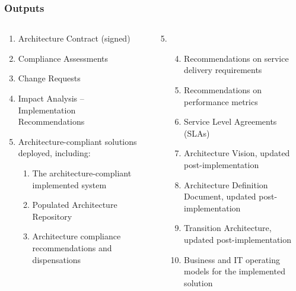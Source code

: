 \documentclass[aspectratio=169, table]{beamer}
\begin{document}
	
	\begin{frame}
		\frametitle{Outputs}
		\vspace{22pt}
		\begin{columns}[onlytextwidth]
			\begin{column}{0.5\textwidth}
				\begin{enumerate}
					\item Architecture Contract (signed)
					\item Compliance Assessments
					\item Change Requests
					\item Impact Analysis – Implementation Recommendations
					\item Architecture-compliant solutions deployed, including:
					\begin{enumerate}
						\item The architecture-compliant implemented system
						\item Populated Architecture Repository
						\item Architecture compliance recommendations and dispensations
					\end{enumerate}
				\end{enumerate}
				
			\end{column}
			\begin{column}{0.5\textwidth}
				\begin{enumerate}
					\setcounter{enumi}{4}
					\item[]
					\begin{enumerate}
						\setcounter{enumii}{3}
						\item Recommendations on service delivery requirements
						\item Recommendations on performance metrics
						\item Service Level Agreements (SLAs)
						\item Architecture Vision, updated post-implementation
						\item Architecture Definition Document, updated post-implementation
						\item Transition Architecture, updated post-implementation
						\item Business and IT operating models for the implemented solution
					\end{enumerate}
				\end{enumerate}
			\end{column}
		\end{columns}
	\end{frame}
	
\end{document}
